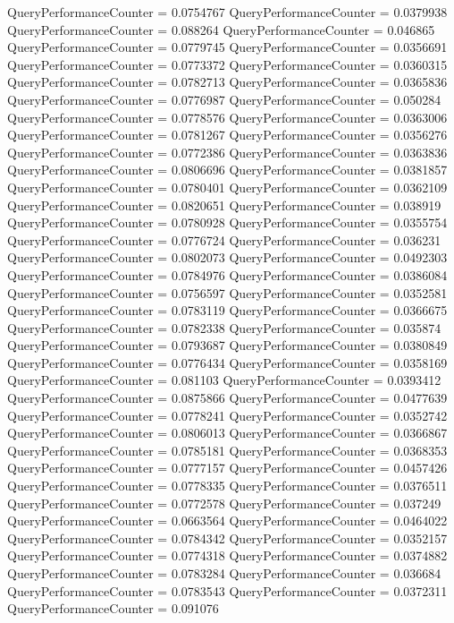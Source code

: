 \documentclass[9pt]{article}
\theoremstyle{plain}
\theoremstyle{definition}
\theoremstyle{remark}
\numberwithin{equation}{section}
\begin{document}
QueryPerformanceCounter  =  0.0754767
QueryPerformanceCounter  =  0.0379938
QueryPerformanceCounter  =  0.088264
QueryPerformanceCounter  =  0.046865
QueryPerformanceCounter  =  0.0779745
QueryPerformanceCounter  =  0.0356691
QueryPerformanceCounter  =  0.0773372
QueryPerformanceCounter  =  0.0360315
QueryPerformanceCounter  =  0.0782713
QueryPerformanceCounter  =  0.0365836
QueryPerformanceCounter  =  0.0776987
QueryPerformanceCounter  =  0.050284
QueryPerformanceCounter  =  0.0778576
QueryPerformanceCounter  =  0.0363006
QueryPerformanceCounter  =  0.0781267
QueryPerformanceCounter  =  0.0356276
QueryPerformanceCounter  =  0.0772386
QueryPerformanceCounter  =  0.0363836
QueryPerformanceCounter  =  0.0806696
QueryPerformanceCounter  =  0.0381857
QueryPerformanceCounter  =  0.0780401
QueryPerformanceCounter  =  0.0362109
QueryPerformanceCounter  =  0.0820651
QueryPerformanceCounter  =  0.038919
QueryPerformanceCounter  =  0.0780928
QueryPerformanceCounter  =  0.0355754
QueryPerformanceCounter  =  0.0776724
QueryPerformanceCounter  =  0.036231
QueryPerformanceCounter  =  0.0802073
QueryPerformanceCounter  =  0.0492303
QueryPerformanceCounter  =  0.0784976
QueryPerformanceCounter  =  0.0386084
QueryPerformanceCounter  =  0.0756597
QueryPerformanceCounter  =  0.0352581
QueryPerformanceCounter  =  0.0783119
QueryPerformanceCounter  =  0.0366675
QueryPerformanceCounter  =  0.0782338
QueryPerformanceCounter  =  0.035874
QueryPerformanceCounter  =  0.0793687
QueryPerformanceCounter  =  0.0380849
QueryPerformanceCounter  =  0.0776434
QueryPerformanceCounter  =  0.0358169
QueryPerformanceCounter  =  0.081103
QueryPerformanceCounter  =  0.0393412
QueryPerformanceCounter  =  0.0875866
QueryPerformanceCounter  =  0.0477639
QueryPerformanceCounter  =  0.0778241
QueryPerformanceCounter  =  0.0352742
QueryPerformanceCounter  =  0.0806013
QueryPerformanceCounter  =  0.0366867
QueryPerformanceCounter  =  0.0785181
QueryPerformanceCounter  =  0.0368353
QueryPerformanceCounter  =  0.0777157
QueryPerformanceCounter  =  0.0457426
QueryPerformanceCounter  =  0.0778335
QueryPerformanceCounter  =  0.0376511
QueryPerformanceCounter  =  0.0772578
QueryPerformanceCounter  =  0.037249
QueryPerformanceCounter  =  0.0663564
QueryPerformanceCounter  =  0.0464022
QueryPerformanceCounter  =  0.0784342
QueryPerformanceCounter  =  0.0352157
QueryPerformanceCounter  =  0.0774318
QueryPerformanceCounter  =  0.0374882
QueryPerformanceCounter  =  0.0783284
QueryPerformanceCounter  =  0.036684
QueryPerformanceCounter  =  0.0783543
QueryPerformanceCounter  =  0.0372311
QueryPerformanceCounter  =  0.091076
\end{document}
